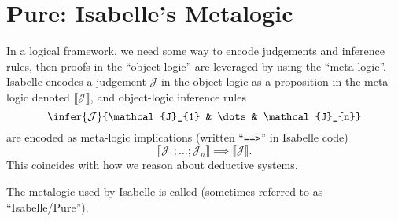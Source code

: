 \section{Pure: Isabelle's Metalogic}
\begin{node}\label{isabelle:metalogic-0000}%
In a logical framework, we need some way to encode judgements and
inference rules, then proofs in the ``object logic'' are leveraged by
using the ``meta-logic''. Isabelle encodes a judgement $\mathcal{J}$ in
the object logic as a proposition in the meta-logic denoted
$\llbracket\mathcal{J}\rrbracket$, and object-logic inference rules
\[\infer{\mathcal{J}}{\mathcal{J}_{1} & \dots & \mathcal{J}_{n}}\]
are encoded as meta-logic implications (written ``\texttt{==>}'' in
Isabelle code)
\[\llbracket\mathcal{J}_{1}; \dots; \mathcal{J}_{n}\rrbracket\implies\llbracket\mathcal{J}\rrbracket.\]
This coincides with how we reason about deductive systems.
\end{node}

\begin{definition}
The metalogic used by Isabelle is called  (sometimes
referred to as ``Isabelle/Pure'').
\end{definition}

